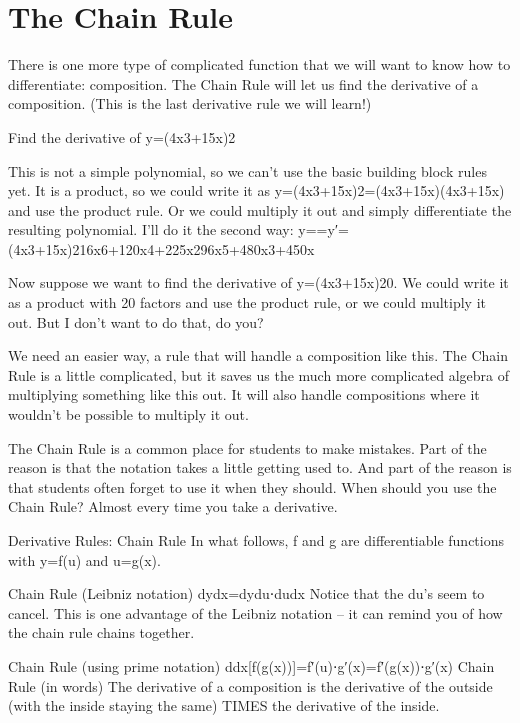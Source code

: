 \section{The Chain Rule}
\label{sec:chain}

There is one more type of complicated function that we will want to know how to differentiate: composition. The Chain Rule will let us find the derivative of a composition. (This is the last derivative rule we will learn!)

\begin{example}
Find the derivative of y=(4x3+15x)2
\begin{solution} This is not a simple polynomial, so we can’t use the basic building block rules yet. It is a product, so we could write it as y=(4x3+15x)2=(4x3+15x)(4x3+15x) and use the product rule. Or we could multiply it out and simply differentiate the resulting polynomial. I’ll do it the second way:
y==y′=(4x3+15x)216x6+120x4+225x296x5+480x3+450x
\end{solution}\end{example}

Now suppose we want to find the derivative of y=(4x3+15x)20. We could write it as a product with 20 factors and use the product rule, or we could multiply it out. But I don't want to do that, do you?

We need an easier way, a rule that will handle a composition like this. The Chain Rule is a little complicated, but it saves us the much more complicated algebra of multiplying something like this out. It will also handle compositions where it wouldn't be possible to multiply it out.

The Chain Rule is a common place for students to make mistakes. Part of the reason is that the notation takes a little getting used to. And part of the reason is that students often forget to use it when they should. When should you use the Chain Rule? Almost every time you take a derivative.

Derivative Rules: Chain Rule
In what follows, f and g are differentiable functions with y=f(u) and u=g(x).

Chain Rule (Leibniz notation)
dydx=dydu⋅dudx
Notice that the du’s seem to cancel. This is one advantage of the Leibniz notation – it can remind you of how the chain rule chains together.

Chain Rule (using prime notation)
ddx[f(g(x))]=f′(u)⋅g′(x)=f′(g(x))⋅g′(x)
Chain Rule (in words)
The derivative of a composition is the derivative of the outside (with the inside staying the same) TIMES the derivative of the inside.

